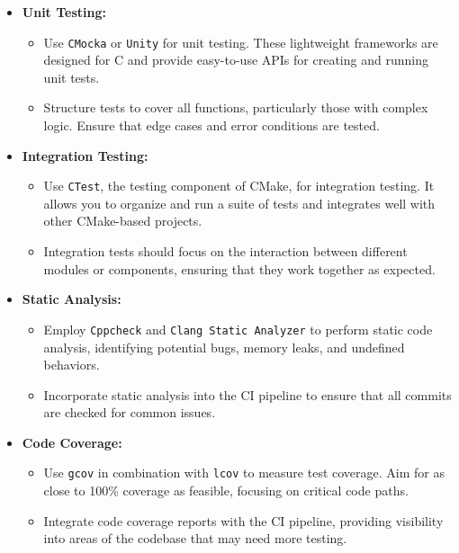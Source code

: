 \documentclass{ol-softwaremanual}
\begin{document}
\begin{itemize}
    \item \textbf{Unit Testing:}
    \begin{itemize}
        \item Use \texttt{CMocka} or \texttt{Unity} for unit testing. These lightweight frameworks are designed for C and provide easy-to-use APIs for creating and running unit tests.
        \item Structure tests to cover all functions, particularly those with complex logic. Ensure that edge cases and error conditions are tested.
    \end{itemize}
    
    \item \textbf{Integration Testing:}
    \begin{itemize}
        \item Use \texttt{CTest}, the testing component of CMake, for integration testing. It allows you to organize and run a suite of tests and integrates well with other CMake-based projects.
        \item Integration tests should focus on the interaction between different modules or components, ensuring that they work together as expected.
    \end{itemize}
    
    \item \textbf{Static Analysis:}
    \begin{itemize}
        \item Employ \texttt{Cppcheck} and \texttt{Clang Static Analyzer} to perform static code analysis, identifying potential bugs, memory leaks, and undefined behaviors.
        \item Incorporate static analysis into the CI pipeline to ensure that all commits are checked for common issues.
    \end{itemize}
    
    \item \textbf{Code Coverage:}
    \begin{itemize}
        \item Use \texttt{gcov} in combination with \texttt{lcov} to measure test coverage. Aim for as close to 100\% coverage as feasible, focusing on critical code paths.
        \item Integrate code coverage reports with the CI pipeline, providing visibility into areas of the codebase that may need more testing.
    \end{itemize}
\end{itemize}
\end{document}
